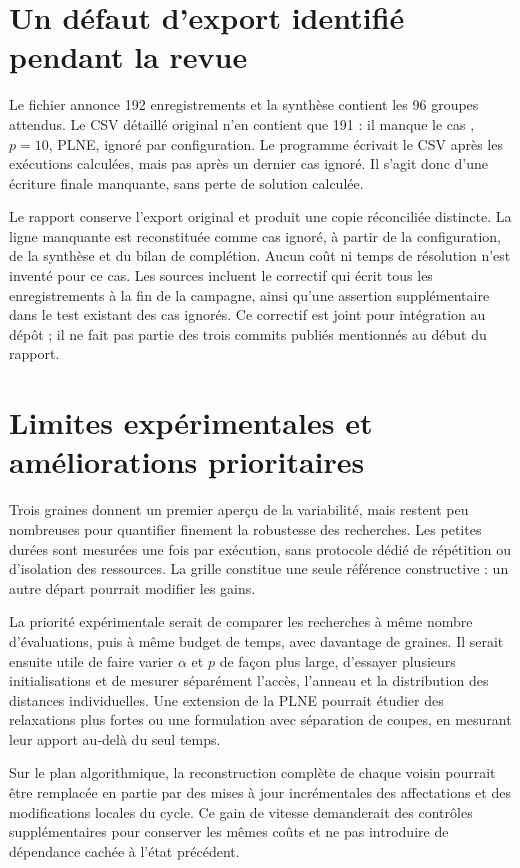 \section{Un défaut d'export identifié pendant la revue}
Le fichier  annonce 192 enregistrements et la synthèse
contient les 96 groupes attendus. Le CSV détaillé original n'en contient que
191 : il manque le cas , $p=10$, PLNE, ignoré par configuration.
Le programme écrivait le CSV après les exécutions calculées, mais pas après
un dernier cas ignoré. Il s'agit donc d'une écriture finale manquante,
sans perte de solution calculée.

Le rapport conserve l'export original et produit une copie réconciliée distincte.
La ligne manquante est reconstituée comme cas ignoré, à partir de la
configuration, de la synthèse et du bilan de complétion. Aucun coût ni
temps de résolution n'est inventé pour ce cas. Les sources incluent le
correctif qui écrit tous les enregistrements à la fin de la campagne,
ainsi qu'une assertion supplémentaire dans le test existant des cas ignorés.
Ce correctif est joint pour intégration au dépôt ; il ne fait pas partie
des trois commits publiés mentionnés au début du rapport.

\section{Limites expérimentales et améliorations prioritaires}
Trois graines donnent un premier aperçu de la variabilité, mais restent peu
nombreuses pour quantifier finement la robustesse des recherches. Les petites
durées sont mesurées une fois par exécution, sans protocole dédié de répétition
ou d'isolation des ressources. La grille constitue une seule référence
constructive : un autre départ pourrait modifier les gains.

La priorité expérimentale serait de comparer les recherches à même nombre
d'évaluations, puis à même budget de temps, avec davantage de graines.
Il serait ensuite utile de faire varier $\alpha$ et $p$ de façon plus large,
d'essayer plusieurs initialisations et de mesurer séparément l'accès,
l'anneau et la distribution des distances individuelles. Une extension de
la PLNE pourrait étudier des relaxations plus fortes ou une formulation
avec séparation de coupes, en mesurant leur apport au-delà du seul temps.

Sur le plan algorithmique, la reconstruction complète de chaque voisin
pourrait être remplacée en partie par des mises à jour incrémentales des
affectations et des modifications locales du cycle. Ce gain de vitesse
demanderait des contrôles supplémentaires pour conserver les mêmes coûts
et ne pas introduire de dépendance cachée à l'état précédent.

